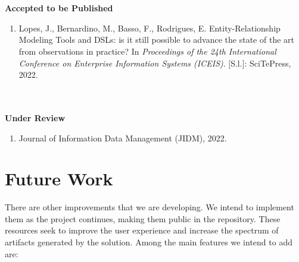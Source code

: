 \\~\\
\textbf{Accepted to be Published} 

    \begin{enumerate}[label=\roman*.]
        \item Lopes, J., Bernardino, M., Basso, F., Rodrigues, E. Entity-Relationship Modeling Tools and DSLs: is it still possible to advance the state of the art from observations in practice? In \textit{Proceedings of the 24th International Conference on Enterprise Information Systems (ICEIS)}. [S.l.]: SciTePress, 2022.
    \end{enumerate} 

\\~\\
\textbf{Under Review}  

\begin{enumerate}[label=\roman*.]
    \item Journal of Information Data Management (JIDM), 2022.
\end{enumerate} 


\section{Future Work}

There are other improvements that we are developing.
We intend to implement them as the project continues, making them public in the repository.
These resources seek to improve the user experience and increase the spectrum of artifacts generated by the solution.
Among the main features we intend to add are:

